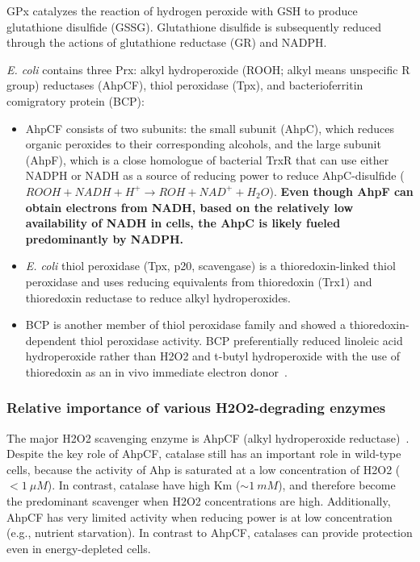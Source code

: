 \documentclass[10pt]{article}
\begin{document}
GPx catalyzes the reaction of hydrogen peroxide with GSH to produce glutathione disulfide (GSSG). Glutathione disulfide is subsequently reduced through the actions of glutathione reductase (GR) and NADPH.

\textit{E. coli} contains three Prx: alkyl hydroperoxide (ROOH; alkyl means unspecific R group) reductases (AhpCF), thiol peroxidase (Tpx), and bacterioferritin comigratory protein (BCP):
\begin{itemize}
\item{AhpCF consists of two subunits: the small subunit (AhpC), which reduces organic peroxides to their corresponding alcohols, and the large subunit (AhpF), which is a close homologue of bacterial TrxR that can use either NADPH or NADH as a source of reducing power to reduce AhpC-disulfide ($ROOH+NADH+H^+\rightarrow ROH+NAD^++H_2O$). \textbf{Even though AhpF can obtain electrons from NADH, based on the relatively low availability of NADH in cells, the AhpC is likely fueled predominantly by NADPH.}}

\item{\textit{E. coli} thiol peroxidase (Tpx, p20, scavengase) is a thioredoxin-linked thiol peroxidase and uses reducing equivalents from thioredoxin (Trx1) and thioredoxin reductase to reduce alkyl hydroperoxides.}

\item{BCP is another member of thiol peroxidase family and showed a thioredoxin-dependent thiol peroxidase activity. BCP preferentially reduced linoleic acid hydroperoxide rather than H2O2 and t-butyl hydroperoxide with the use of thioredoxin as an in vivo immediate electron donor~\cite{jeong2000thioredoxin}.}
\end{itemize}

\subsubsection{Relative importance of various H2O2-degrading enzymes}

The major H2O2 scavenging enzyme is AhpCF (alkyl hydroperoxide reductase)~\cite{seaver2001alkyl}. Despite the key role of AhpCF, catalase still has an important role in wild-type cells, because the activity of Ahp is saturated at a low concentration of H2O2 ($< 1~\mu M$). In contrast, catalase have high Km ($\sim 1~mM$), and therefore become the predominant scavenger when H2O2 concentrations are high. Additionally,  AhpCF has very limited activity when reducing power is at low concentration (e.g., nutrient starvation). In contrast to AhpCF, catalases can provide protection even in energy-depleted cells.
\end{document}
